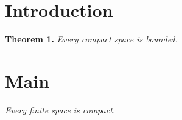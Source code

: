 \documentclass{article}
\begin{document}
\section{Introduction}
{\bf Theorem 1.} {\em Every compact space is bounded.}

\section{Main}\label{sec:main}
 {\em Every finite space is compact.}
\end{document}
